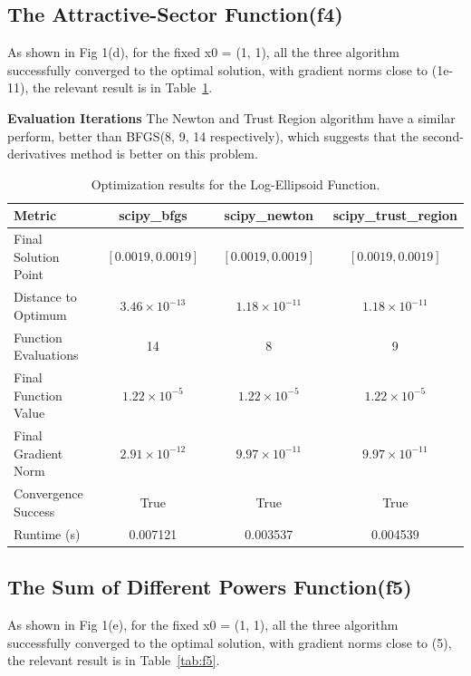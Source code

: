 \documentclass[12pt]{article}
\begin{document}
\subsection{The Attractive-Sector Function(f4)}
As shown in  Fig 1(d), for the fixed x0 = (1, 1), all the three algorithm  successfully converged to the optimal solution, with gradient norms close to (1e-11), the relevant result is in Table~\ref{tab:f4}.

\textbf{Evaluation Iterations}  
The Newton and Trust Region algorithm have a similar perform, better than BFGS(8, 9, 14 respectively), which suggests that the second-derivatives method is better on this problem.

\begin{table}[h]
    \centering
    \begin{tabular}{lccc}
        \toprule
        Metric & scipy\_bfgs & scipy\_newton & scipy\_trust\_region \\
        \midrule
        Final Solution Point & 
        $\begin{array}{c} [0.0019, 0.0019] \end{array}$ & 
        $\begin{array}{c} [0.0019, 0.0019] \end{array}$ & 
        $\begin{array}{c} [0.0019, 0.0019] \end{array}$ \\
        Distance to Optimum & $3.46\times10^{-13}$ & $1.18\times10^{-11}$ & $1.18\times10^{-11}$ \\
        Function Evaluations & 14 & 8 & 9 \\
        Final Function Value & $1.22\times10^{-5}$ & $1.22\times10^{-5}$ & $1.22\times10^{-5}$ \\
        Final Gradient Norm & $2.91\times10^{-12}$ & $9.97\times10^{-11}$ & $9.97\times10^{-11}$ \\
        Convergence Success & True & True & True \\
        Runtime (s) & 0.007121 & 0.003537 & 0.004539 \\
        \bottomrule
    \end{tabular}
    \caption{Optimization results for the Log-Ellipsoid Function.}
    \label{tab:f4}
\end{table}

\subsection{The Sum of Different Powers Function(f5)}
As shown in  Fig 1(e), for the fixed x0 = (1, 1), all the three algorithm  successfully converged to the optimal solution, with gradient norms close to (5), the relevant result is in Table~\ref{tab:f5}.
\end{document}
